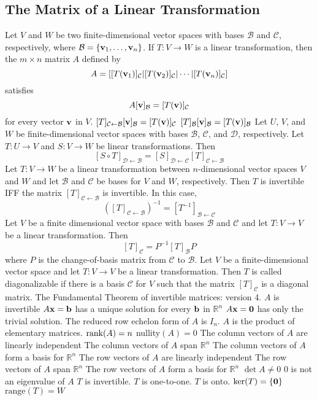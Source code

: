 \documentclass{article}
\begin{document}
    \subsection{The Matrix of a Linear Transformation}
    \begin{outline}
        \1 Let $V$ and $W$ be two finite-dimensional vector spaces with bases \(\mathcal B\) and \(\mathcal C\), respectively, where \(\mathcal B=\{\vb v_1,\ldots,\vb v_n\}\). If \(T:V\to W\) is a linear transformation, then the \(m\times n\) matrix $A$ defined by \[A=[[T(\vb v_1)]_\mathcal C|[T(\vb v_2)]_\mathcal C|\cdots|[T(\vb v_n)]_\mathcal C]\] satisfies \[A[\vb v]_\mathcal B=[T(\vb v)]_\mathcal C\] for every vector \(\vb v\) in $V$. 
        \1 \([T]_{\mathcal C\leftarrow\mathcal B}[\vb v]_\mathcal B=[T(\vb v)]_\mathcal C\)
        \1 \([T]_\mathcal B[\vb v]_\mathcal B=[T(\vb v)]_\mathcal B\)
        \1 Let $U$, $V$, and $W$ be finite-dimensional vector spaces with bases \(\mathcal B\), \(\mathcal C\), and \(\mathcal D\), respectively. Let \(T:U\to V\) and \(S:V\to W\) be linear transformations. Then \[[S\circ T]_{\mathcal D\leftarrow\mathcal B}=[S]_{\mathcal D\leftarrow\mathcal C}[T]_{\mathcal C\leftarrow\mathcal B}\]
        \1 Let \(T:V\to W\) be a linear transformation between $n$-dimensional vector spaces $V$ and $W$ and let \(\mathcal B\) and \(\mathcal C\) be bases for $V$ and $W$, respectively. Then $T$ is invertible IFF the matrix \([T]_{\mathcal C\leftarrow\mathcal B}\) is invertible. In this case, \[([T]_{\mathcal C\leftarrow\mathcal B})^{-1}=[T^{-1}]_{\mathcal B\leftarrow\mathcal C}\]
        \1 Let $V$ be a finite dimensional vector space with bases \(\mathcal B\) and \(\mathcal C\) and let \(T:V\to V\) be a linear transformation. Then \[[T]_\mathcal C=P^{-1}[T]_\mathcal BP\] where $P$ is the change-of-basis matrix from \(\mathcal C\) to \(\mathcal B\). 
        \1 Let $V$ be a finite-dimensional vector space and let \(T:V\to V\) be a linear transformation. Then $T$ is called diagonalizable if there is a basis \(\mathcal C\) for $V$ such that the matrix \([T]_\mathcal C\) is a diagonal matrix. 
        \1 The Fundamental Theorem of invertible matrices: version 4. 
            \2 $A$ is invertible
            \2 $A\vb x=\vb b$ has a unique solution for every \(\vb b\) in \(\mathbb R^n\)
            \2 \(A\vb x=\vb 0\) has only the trivial solution. 
            \2 The reduced row echelon form of $A$ is \(I_n\). 
            \2 $A$ is the product of elementary matrices. 
            \2 \(\rank (A)=n\)
            \2 nullity\((A)=0\)
            \2 The column vectors of $A$ are linearly independent
            \2 The column vectors of $A$ span \(\mathbb R^n\)
            \2 The column vectors of $A$ form a basis for \(\mathbb R^n\)
            \2 The row vectors of $A$ are linearly independent
            \2 The row vectors of $A$ span \(\mathbb R^n\)
            \2 The row vectors of $A$ form a basis for \(\mathbb R^n\)
            \2 \(\det A\neq 0\)
            \2 $0$ is not an eigenvalue of $A$
            \2 $T$ is invertible. 
            \2 $T$ is one-to-one. 
            \2 $T$ is onto. 
            \2 \(\text{ker}(T)=\{\vb 0\}\)
            \2 \(\text{range}(T)=W\)
    \end{outline}
\end{document}
